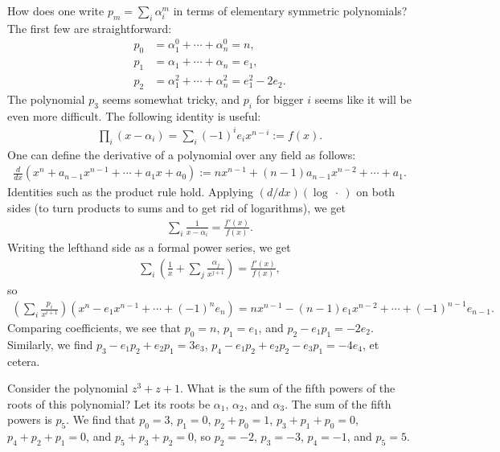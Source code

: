 \documentclass[11pt, oneside,margin=1in]{article}
\begin{document}
How does one write $p_m = \sum_i\alpha_i^m$ in terms of elementary symmetric polynomials? The first few are straightforward:
\begin{align*}
	p_0 &= \alpha_1 ^0 + \cdots +\alpha_n^0 = n,\\
	p_1 &= \alpha_1 + \cdots + \alpha_n = e_1,\\
	p_2 &= \alpha_1^2 + \cdots + \alpha_n^2 = e_1^2 - 2e_2.
\end{align*}
The polynomial $p_3$ seems somewhat tricky, and $p_i$ for bigger $i$ seems like it will be even more difficult. The following identity is useful:
\begin{align*}
	\prod_{i} (x-\alpha_i) = \sum_i (-1)^i e_ix^{n-i}:= f(x).
\end{align*}
One can define the derivative of a polynomial over any field as follows:
\begin{align*}
	\frac{d}{dx} (x^n + a_{n-1}x^{n-1} + \cdots +a_1x +  a_0) := nx^{n-1} +  (n-1)a_{n-1}x^{n-2} + \cdots + a_1. 
\end{align*}
Identities such as the product rule hold. Applying $(d/dx)(\log \ \cdot\ )$ on both sides (to turn products to sums and to get rid of logarithms), we get
\begin{align*}
	\sum_i \frac{1}{x-\alpha_i} = \frac{f'(x)}{f(x)}.
\end{align*}
Writing the lefthand side as a formal power series, we get
\begin{align*}
	\sum_i \left(\frac{1}{x} + \sum_j \frac{\alpha_j}{x^{j+1}}  \right) = \frac{f'(x)}{f(x)},
\end{align*}
so
\begin{align*}
	\left( \sum_i \frac{p_i}{x^{i+1}} \right) (x^n - e_1x^{n-1} + \cdots + (-1)^ne_n) = nx^{n-1} - (n-1)e_1x^{n-2} + \cdots +  (-1)^{n-1} e_{n-1}.
\end{align*}
Comparing coefficients, we see that $p_0 = n$, $p_1 = e_1$, and $p_2 - e_1p_1 = -2e_2$. Similarly, we find $p_3-e_1p_2 + e_2p_1 = 3e_3 $, $p_4 - e_1p_2 + e_2p_2 - e_3 p_1 = -4e_4$, et cetera.
\begin{example}[ ]\label{}
Consider the polynomial $z^3 + z + 1$. What is the sum of the fifth powers of the roots of this polynomial? Let its roots be $\alpha_1$, $\alpha_2$, and $\alpha_3$. The sum of the fifth powers is $p_5$. We find that $p_0 = 3$, $p_1 = 0$, $p_2 + p_0 = 1$, $p_3 + p_1 + p_0 = 0$, $p_4 + p_2 + p_1 = 0$, and $p_5 + p_3 + p_2 = 0$, so $p_2 = -2$, $p_3 = -3$, $p_4 = -1$, and $p_5 = 5$.
\end{example}
\end{document}
